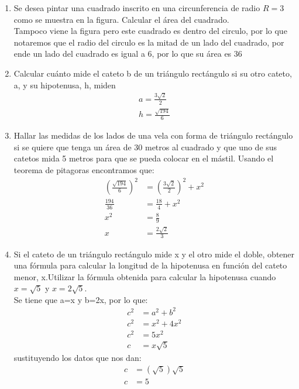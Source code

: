 \documentclass[12pt,letterpaper]{report}
\begin{document}
\begin{enumerate}
\begin{align*}
    2x^2+4x-96&=0\\
    x^2+2x-48&=0\\
    (x-6)(x+8)&=0\\
    x=6,-8
\end{align*}
usando x=6, encontramos que el otro lado es 8
\item Se desea pintar una cuadrado inscrito en una circunferencia de radio 
$R=3$ como se muestra en la figura. Calcular el área del cuadrado.\\
Tampoco viene la figura pero este cuadrado es dentro del circulo, por lo que notaremos que el radio del circulo es la mitad de un lado del cuadrado, por ende un lado del cuadrado es igual a 6, por lo que su área es 36
\item Calcular cuánto mide el cateto b de un triángulo rectángulo si su otro cateto, a, y su hipotenusa, h, miden 
\begin{eqnarray*}
a=\frac{3\sqrt{2}}{2} \\
h=\frac{\sqrt{194}}{6}
\end{eqnarray*}
\item Hallar las medidas de los lados de una vela con forma de triángulo rectángulo si se quiere que tenga un área de 30 metros al cuadrado y que uno de sus catetos mida 5 metros para que se pueda colocar en el mástil.
Usando el teorema de pitagoras encontramos que:
\begin{align*}
    \left(\frac{\sqrt{194}}{6} \right)^2& =\left(\frac{3\sqrt{2}}{2} \right)^2 +x^2\\
    \frac{194}{36} &= \frac{18}{4} + x^2  \\
    x^2&= \frac{8}{9}\\
    x&= \frac{2\sqrt{2}}{3}
\end{align*}
\item Si el cateto de un triángulo rectángulo mide x y el otro mide el doble, obtener una fórmula para calcular la longitud de la hipotenusa en función del cateto menor, x.Utilizar la fórmula obtenida para calcular la hipotenusa cuando $x=\sqrt{5}$ y $x=2\sqrt{5}.$\\
Se tiene que a=x y b=2x, por lo que:
\begin{align*}
    c^2&=a^2+b^2\\
    c^2&=x^2+4x^2\\
    c^2&=5x^2\\
    c&=x\sqrt{5}
\end{align*}
sustituyendo los datos que nos dan:
\begin{align*}
    c&=(\sqrt{5})\sqrt{5}\\
    c&=5
\end{align*}
\end{enumerate}
\end{document}
